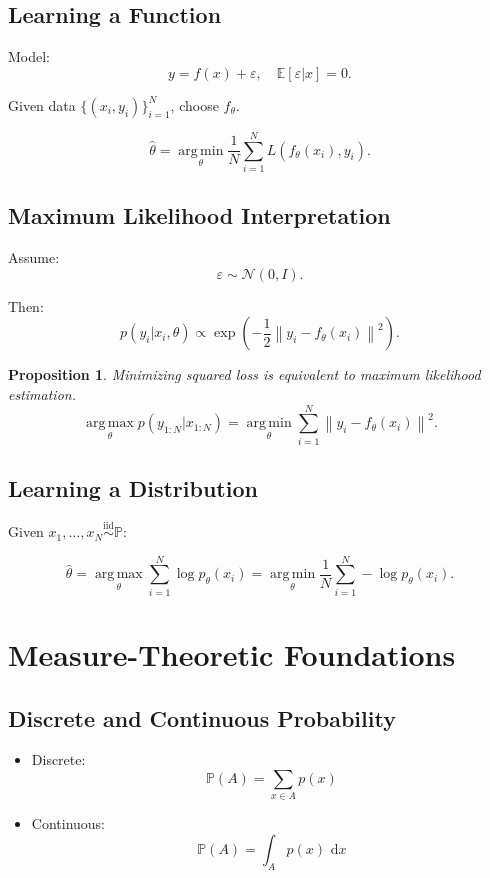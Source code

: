\documentclass[12pt,oneside]{book}
\numberwithin{equation}{section}
\theoremstyle{definition}
\theoremstyle{plain}
\newtheorem{proposition}{Proposition}[section]
\theoremstyle{remark}
\newcommand{\E}{\mathbb{E}}
\newcommand{\Prob}{\mathbb{P}}
\newcommand{\iid}{\overset{\text{iid}}{\sim}}
\newcommand{\argmin}{\operatorname*{arg\,min}}
\newcommand{\argmax}{\operatorname*{arg\,max}}
\newcommand{\norm}[1]{\left\lVert #1 \right\rVert}
\newcommand{\dd}{\,\mathrm{d}}
\newcommand{\Normal}{\mathcal{N}}
\begin{document}
\subsection{Learning a Function}

Model:
\[
y = f(x) + \varepsilon, \quad \E[\varepsilon | x] = 0.
\]

Given data $\{(x_i,y_i)\}_{i=1}^N$, choose $f_\theta$.

\[
\hat{\theta} = \argmin_\theta \frac{1}{N}\sum_{i=1}^N L(f_\theta(x_i),y_i).
\]


\subsection{Maximum Likelihood Interpretation}

Assume:
\[
\varepsilon \sim \Normal(0,I).
\]

Then:
\[
p(y_i | x_i,\theta)
\propto \exp\left(-\frac{1}{2}\norm{y_i - f_\theta(x_i)}^2\right).
\]

\begin{proposition}
Minimizing squared loss is equivalent to maximum likelihood estimation.
\[
\argmax_\theta p(y_{1:N} | x_{1:N})
=
\argmin_\theta \sum_{i=1}^N \norm{y_i - f_\theta(x_i)}^2.
\]
\end{proposition}


\subsection{Learning a Distribution}

Given $x_1,\dots,x_N \iid \Prob$:

\[
\hat{\theta} = \argmax_\theta \sum_{i=1}^N \log p_\theta(x_i)
=
\argmin_\theta \frac{1}{N}\sum_{i=1}^N -\log p_\theta(x_i).
\]


\section{Measure-Theoretic Foundations}

\subsection{Discrete and Continuous Probability}

\begin{itemize}
\item Discrete:
\[
\Prob(A) = \sum_{x \in A} p(x)
\]

\item Continuous:
\[
\Prob(A) = \int_A p(x)\,\dd x
\]
\end{itemize}
\end{document}
